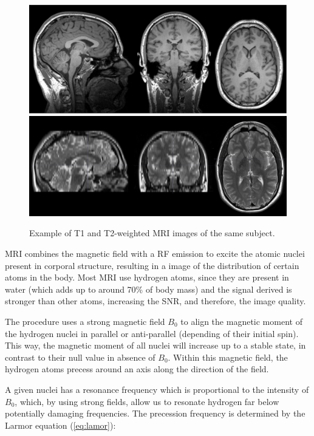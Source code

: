 \begin{figure}[htp]
	\centering
	\includegraphics[width=0.7\linewidth]{Graphics/ch1/example_MRIT1}\\
	\includegraphics[width=0.7\linewidth]{Graphics/ch1/example_MRIT2}
	\caption[Example of T1 and T2-weighted MRI images.]{Example of T1 and T2-weighted MRI images of the same subject.}
	\label{fig:example_MRI}
\end{figure}

\ac{MRI} combines the magnetic field with a \ac{RF} emission to excite the atomic nuclei present in corporal structure, resulting in a image of the distribution of certain atoms in the body. Most \ac{MRI} use hydrogen atoms, since they are present in water (which adds up to around 70\% of body mass) and the signal derived is stronger than other atoms, increasing the \ac{SNR}, and therefore, the image quality. 

The procedure uses a strong magnetic field $B_0$ to align the magnetic moment of the hydrogen nuclei in parallel or anti-parallel (depending of their initial spin). This way, the magnetic moment of all nuclei will increase up to a stable state, in contrast to their null value in absence of $B_0$. Within this magnetic field, the hydrogen atoms precess around an axis along the direction of the field. 

A given nuclei has a resonance frequency which is proportional to the intensity of $B_0$, which, by using strong fields, allow us to resonate hydrogen far below potentially damaging frequencies. The precession frequency is determined by the Larmor equation (\ref{eq:lamor}):

